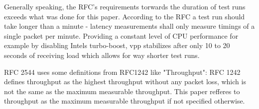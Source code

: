 Generally speaking, the RFC's requirements torwards the duration of
test runs exceeds what was done for this paper. According to the RFC a
test run should take longer than a minute - latency measurements shall
only measure timings of a single packet per minute. Providing a
constant level of CPU performance for example by disabling Intels
turbo-boost, \Ac{vpp} stabilizes after only 10 to 20 seconds of
receiving load which allows for way shorter test runs.


RFC 2544 uses some definitions from RFC1242 \cite{rfc1242} like
"Throughput": RFC 1242 defines throughput as the highest throughput
without any packet loss, which is not the same as the maximum
measurable throughput. This paper refferes to throughput as the
maximum measurable throughput if not specified otherwise.




